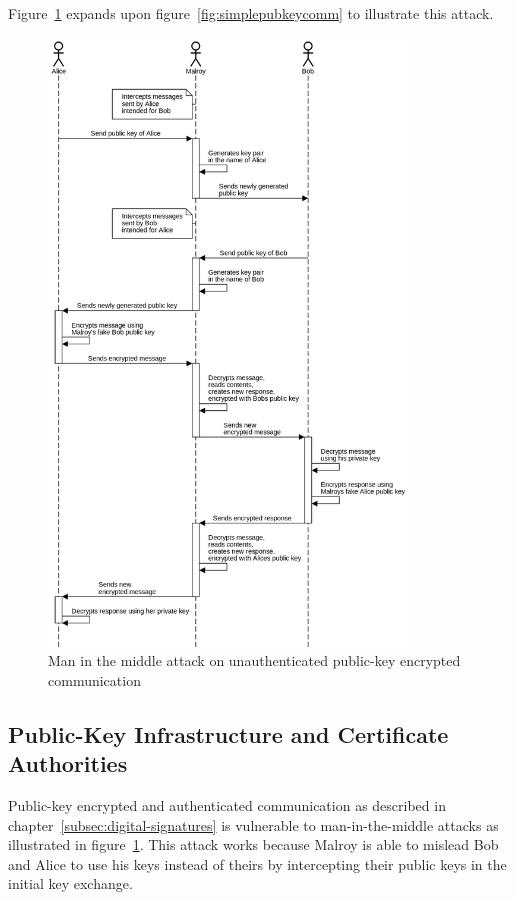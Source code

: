 Figure~\ref{fig:pubkeymidm} expands upon figure~\ref{fig:simplepubkeycomm} to illustrate this attack.

\begin{figure}
    \centering
    \includegraphics[width=0.85\textwidth]{images/pubkey_midm.png}
    \caption{Man in the middle attack on unauthenticated public-key encrypted communication}
    \label{fig:pubkeymidm}
\end{figure}


\subsection{Public-Key Infrastructure and Certificate Authorities}\label{subsec:public-key-infrastructure-and-certificate-authorities}
Public-key encrypted and authenticated communication as described in chapter~\ref{subsec:digital-signatures}
is vulnerable to man-in-the-middle attacks as illustrated in figure~\ref{fig:pubkeymidm}.
This attack works because Malroy is able to mislead Bob and Alice to use his keys instead of theirs
by intercepting their public keys in the initial key exchange.

